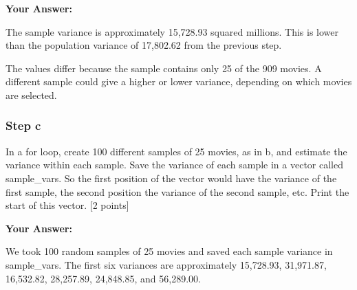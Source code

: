 \documentclass[
]{article}
\newenvironment{Shaded}{\begin{snugshade}}{\end{snugshade}}
\newcommand{\CommentTok}[1]{\textcolor[rgb]{0.56,0.35,0.01}{\textit{#1}}}
\newcommand{\ControlFlowTok}[1]{\textcolor[rgb]{0.13,0.29,0.53}{\textbf{#1}}}
\newcommand{\DecValTok}[1]{\textcolor[rgb]{0.00,0.00,0.81}{#1}}
\newcommand{\DocumentationTok}[1]{\textcolor[rgb]{0.56,0.35,0.01}{\textbf{\textit{#1}}}}
\newcommand{\FunctionTok}[1]{\textcolor[rgb]{0.13,0.29,0.53}{\textbf{#1}}}
\newcommand{\NormalTok}[1]{#1}
\newcommand{\OtherTok}[1]{\textcolor[rgb]{0.56,0.35,0.01}{#1}}
\newcommand{\SpecialCharTok}[1]{\textcolor[rgb]{0.81,0.36,0.00}{\textbf{#1}}}
\begin{document}
\textbf{Your Answer:}

The sample variance is approximately 15,728.93 squared millions. This is
lower than the population variance of 17,802.62 from the previous step.

The values differ because the sample contains only 25 of the 909 movies.
A different sample could give a higher or lower variance, depending on
which movies are selected.

\subsubsection{Step c}\label{step-c-2}

In a for loop, create 100 different samples of 25 movies, as in b, and
estimate the variance within each sample. Save the variance of each
sample in a vector called sample\_vars. So the first position of the
vector would have the variance of the first sample, the second position
the variance of the second sample, etc. Print the start of this vector.
{[}2 points{]}

\begin{Shaded}
\end{Shaded}

\textbf{Your Answer:}

We took 100 random samples of 25 movies and saved each sample variance
in sample\_vars. The first six variances are approximately 15,728.93,
31,971.87, 16,532.82, 28,257.89, 24,848.85, and 56,289.00.
\end{document}
